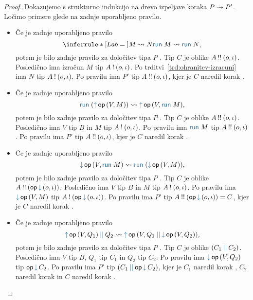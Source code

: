 \begin{proof}
	Dokazujemo s strukturno indukcijo na drevo izpeljave koraka $P \leadsto P'$.
	Ločimo primere glede na zadnje uporabljeno pravilo.
	
	\begin{itemize}
		\item Če je zadnje uporabljeno pravilo
		$$
		\coopinfer{}{
			M \reduces N
		}{
			\tmrun M \reduces \tmrun N
		},$$
		potem je bilo zadnje pravilo za določitev tipa $P$ . Tip $C$ je oblike $A \mathbin{!!} (o, \iota)$.
		Posledično ima izračun $M$ tip $A \mathbin{!} (o, \iota)$. Po trditvi~\ref{trd:ohranitev-izracuni} ima $N$ tip $A \mathbin{!} (o, \iota)$.
		Po pravilu  ima $P'$ tip $A \mathbin{!!} (o, \iota)$, kjer je $C$ naredil korak .
	
		\item Če je zadnje uporabljeno pravilo
		$$\tmrun {(\tmopout{op}{V}{M})}  \reduces \tmopout{op}{V}{\tmrun M},$$
		potem je bilo zadnje pravilo za določitev tipa $P$ . Tip $C$ je oblike $A \mathbin{!!} (o, \iota)$.
		Posledično ima $V$ tip $B$ in $M$ tip $A \mathbin{!} (o, \iota)$.
		Po pravilu  ima $\tmrun{M}$ tip $A \mathbin{!!} (o, \iota)$.
		Po pravilu  ima $P'$ tip $A \mathbin{!!} (o, \iota)$, kjer je $C$ naredil korak .
		
		\item Če je zadnje uporabljeno pravilo
		$$\tmopin{op}{V}{\tmrun M} \reduces \tmrun {(\tmopin{op}{V}{M})},$$
		potem je bilo zadnje pravilo za določitev tipa $P$ . Tip $C$ je oblike $\tyrun{A}{\opincomp{op}{(\o, \i)}}$.
		Posledično ima $V$ tip $B$ in $M$ tip $A \mathbin{!} (o, \iota)$.
		Po pravilu  ima $\tmopin{op}{V}{M}$ tip $\tycomp{A}{\opincomp{op}{(\o, \i)}}$.
		Po pravilu  ima $P'$ tip $\tyrun{A}{\opincomp{op}{(\o, \i)}} = C$, kjer je $C$ naredil korak .
		
		\item Če je zadnje uporabljeno pravilo
		$$\tmpar{\tmopout{op}{V}{Q_1}}{Q_2} \reduces \tmopout{op}{V}{\tmpar{Q_1}{\tmopin{op}{V}{Q_2}}},$$
		potem je bilo zadnje pravilo za določitev tipa $P$ . Tip $C$ je oblike $\typar{C_1}{C_2}$.
		Posledično ima $V$ tip $B$, $Q_1$ tip $C_1$ in $Q_2$ tip $C_2$.
		Po pravilu  ima $\tmopin{op}{V}{Q_2}$ tip $\opincomp{op}{C_2}$.
		Po pravilu  ima $P'$ tip $\typar{C_1}{\opincomp{op}{C_2}}$, kjer je $C_1$ naredil korak , $C_2$ naredil korak  in $C$ naredil korak .


\end{itemize}
\end{proof}
